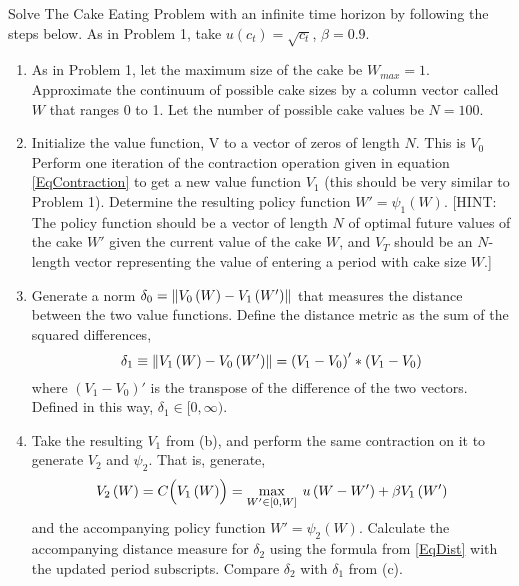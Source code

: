 \begin{problem}
Solve The Cake Eating Problem with an infinite time horizon by following the steps below.  As in Problem 1, take $u(c_t) = \sqrt{c_t}$, $\beta = 0.9$.
\begin{enumerate}
   \item As in Problem 1, let the maximum size of the cake be $W_{max} = 1$. Approximate the continuum of possible cake sizes by a column vector called $W$ that ranges 0 to 1.  Let the number of possible cake values be $N=100$.

   \item  Initialize the value function, V to a vector of zeros of length $N$.  This is $V_0$  Perform one iteration of the contraction operation given in equation \eqref{EqContraction} to get a new value function $V_1$ (this should be very similar to Problem 1).  Determine the resulting policy function $W' = \psi_1\left(W\right)$.  [HINT: The policy function should be a vector of length $N$ of optimal future values of the cake $W'$ given the current value of the cake $W$, and $V_T$ should be an $N$-length vector representing the value of entering a period with cake size $W$.]

   \item Generate a norm $\delta_0 = \left\lVert V_0\left(W\right) - V_1\left(W'\right)\right\rVert$ that measures the distance between the two value functions. Define the distance metric as the sum of the squared differences,
   \begin{equation}\label{EqDist}
      \delta_1\equiv \left\lVert V_1\left(W\right) - V_0\left(W'\right)\right\rVert = \left(V_1 - V_0\right)'*\left(V_1 - V_0\right)
   \end{equation}
   where $\left(V_1-V_0\right)'$ is the transpose of the difference of the two vectors. Defined in this way, $\delta_1\in [0,\infty)$.

   \item Take the resulting $V_1$ from (b), and perform the same contraction on it to generate $V_2$ and $\psi_2$. That is, generate,
   \begin{equation*}
      V_2\left(W\right) = C\Bigl(V_1\left(W\right)\Bigr) = \max_{W'\in[0,W]}\: u\left(W - W'\right) + \beta V_1\left(W'\right)
   \end{equation*}
   and the accompanying policy function $W'=\psi_2\left(W\right)$. Calculate the accompanying distance measure for $\delta_2$ using the formula from \eqref{EqDist} with the updated period subscripts. Compare $\delta_2$ with $\delta_1$ from (c).


\end{enumerate}
\end{problem}
